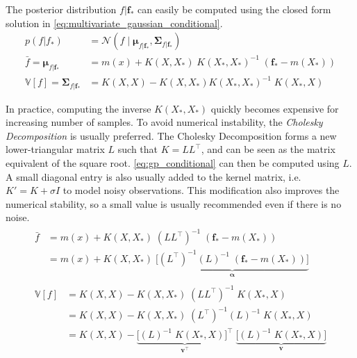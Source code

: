 The posterior distribution $f | \boldsymbol{f}_*$ can easily be computed using the closed form solution in \cref{eq:multivariate_gaussian_conditional}.
\begin{subequations}\label{eq:gp_conditional}
\begin{align}
    p(f | f_*) &= \mathcal{N}(f \; | \; \boldsymbol{\mu}_{f|\boldsymbol{f}_*}, \boldsymbol{\Sigma}_{f|\boldsymbol{f}_*})\\
    \bar{f} = \boldsymbol{\mu}_{f|\boldsymbol{f}_*} &= m(x) + K(X, X_*) \; K(X_*, X_*)^{-1} \; (\boldsymbol{f}_* - m(X_*))\label{eq:gp_conditional_mean}\\
    \mathbb{V}[f] = \boldsymbol{\Sigma}_{f|\boldsymbol{f}_*} &= K(X, X) - K(X, X_*)  K(X_*, X_*)^{-1} \; K(X_*, X)\label{eq:gp_conditional_var}
\end{align}
\end{subequations}

In practice, computing the inverse $K(X_*, X_*)$ quickly becomes expensive for increasing number of samples. To avoid numerical instability, the \textit{Cholesky Decomposition} is usually preferred. The Cholesky Decomposition forms a new lower-triangular matrix $L$ such that $K = L L^\intercal$, and can be seen as the matrix equivalent of the square root. \cref{eq:gp_conditional} can then be computed using $L$. A small diagonal entry is also usually added to the kernel matrix, i.e. $K' = K + \sigma I$ to model noisy observations. This modification also improves the numerical stability, so a small value is usually recommended even if there is no noise.
\begin{subequations}
\begin{align}
    \begin{split}
    \bar{f} &= m(x) + K(X, X_*) \; (L L^\intercal)^{-1} \; (\boldsymbol{f}_* - m(X_*))\\ &= m(x) + K(X, X_*) \; \underbrace{\big[(L^\intercal)^{-1} (L)^{-1}  \; (\boldsymbol{f}_* - m(X_*))\big]}_{\boldsymbol{\alpha}}
    \end{split}\\
    \begin{split}
    \mathbb{V}[f] &= K(X, X) - K(X, X_*) \; (L L^\intercal)^{-1} \; K(X_*, X)\\
    &= K(X, X) - K(X, X_*) \; (L^\intercal)^{-1} (L)^{-1} \; K(X_*, X)\\
    &= K(X, X) - \underbrace{\big[(L)^{-1} \; K(X_*, X)\big]^\intercal}_{\boldsymbol{v^\intercal}} \; \underbrace{\big[(L)^{-1} \; K(X_*, X)\big]}_{\boldsymbol{v}}
    \end{split}
\end{align}
\end{subequations}

